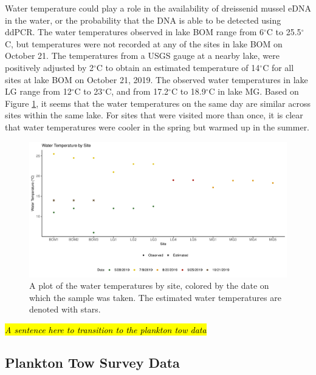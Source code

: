 \documentclass[12pt]{article}\usepackage[]{graphicx}\usepackage[]{color}
\makeatletter
\def\maxwidth{ %
  \ifdim\Gin@nat@width>\linewidth
    \linewidth
  \else
    \Gin@nat@width
  \fi
}
\newenvironment{knitrout}{}{} %
\def\maxwidth{ %
  \ifdim\Gin@nat@width>\linewidth
    \linewidth
  \else
    \Gin@nat@width
  \fi
}
\newenvironment{knitrout}{}{} %
\makeatother
\begin{document}
Water temperature could play a role in the availability of dreissenid mussel eDNA in the water, or the probability that the DNA is able to be detected using ddPCR. The water temperatures observed in lake BOM range from 6$^\circ$C to 25.5$^\circ$C, but temperatures were not recorded at any of the sites in lake BOM on October 21. The temperatures from a USGS gauge at a nearby lake, were positively adjusted by 2$^\circ$C to obtain an estimated temperature of 14$^\circ$C for all sites at lake BOM on October 21, 2019. The observed water temperatures in lake LG range from 12$^\circ$C to 23$^\circ$C, and from 17.2$^\circ$C to 18.9$^\circ$C in lake MG. Based on Figure \ref{fig:eDNA_temp}, it seems that the water temperatures on the same day are similar across sites within the same lake. For sites that were visited more than once, it is clear that water temperatures were cooler in the spring but warmed up in the summer. 

\begin{figure}[]
\begin{knitrout}
\color{fgcolor}

{\centering \includegraphics[width=\maxwidth]{figure/eDNA_visualization_temp-1} 

}



\end{knitrout}
\caption{A plot of the water temperatures by site, colored by the date on which the sample was taken. The estimated water temperatures are denoted with stars.}
\label{fig:eDNA_temp}
\end{figure}

\hl{\textit{A sentence here to transition to the plankton tow data}}

\subsection{Plankton Tow Survey Data}
\end{document}
